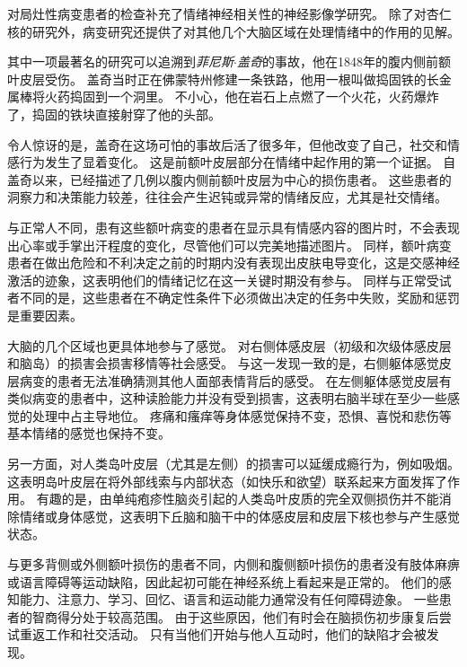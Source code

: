 \begin{proposition}[情绪损伤研究] \label{box:42_2}
	
	\quad \quad 对局灶性病变患者的检查补充了情绪神经相关性的神经影像学研究。
	除了对杏仁核的研究外，病变研究还提供了对其他几个大脑区域在处理情绪中的作用的见解。
	
	\quad \quad 其中一项最著名的研究可以追溯到\textit{菲尼斯$\cdot$盖奇}的事故，他在1848年的腹内侧前额叶皮层受伤。
	盖奇当时正在佛蒙特州修建一条铁路，他用一根叫做捣固铁的长金属棒将火药捣固到一个洞里。
	不小心，他在岩石上点燃了一个火花，火药爆炸了，捣固的铁块直接射穿了他的头部。
	
	\quad \quad 令人惊讶的是，盖奇在这场可怕的事故后活了很多年，但他改变了自己，社交和情感行为发生了显着变化。
	这是前额叶皮层部分在情绪中起作用的第一个证据。
	自盖奇以来，已经描述了几例以腹内侧前额叶皮层为中心的损伤患者。
	这些患者的洞察力和决策能力较差，往往会产生迟钝或异常的情绪反应，尤其是社交情绪。
	
	\quad \quad 与正常人不同，患有这些额叶病变的患者在显示具有情感内容的图片时，不会表现出心率或手掌出汗程度的变化，尽管他们可以完美地描述图片。
	同样，额叶病变患者在做出危险和不利决定之前的时期内没有表现出皮肤电导变化，这是交感神经激活的迹象，这表明他们的情绪记忆在这一关键时期没有参与。
	同样与正常受试者不同的是，这些患者在不确定性条件下必须做出决定的任务中失败，奖励和惩罚是重要因素。
	
	\quad \quad 大脑的几个区域也更具体地参与了感觉。
	对右侧体感皮层（初级和次级体感皮层和脑岛）的损害会损害移情等社会感受。
	与这一发现一致的是，右侧躯体感觉皮层病变的患者无法准确猜测其他人面部表情背后的感受。
	在左侧躯体感觉皮层有类似病变的患者中，这种读脸能力并没有受到损害，这表明右脑半球在至少一些感觉的处理中占主导地位。
	疼痛和瘙痒等身体感觉保持不变，恐惧、喜悦和悲伤等基本情绪的感觉也保持不变。
	
	\quad \quad 另一方面，对人类岛叶皮层（尤其是左侧）的损害可以延缓成瘾行为，例如吸烟。
	这表明岛叶皮层在将外部线索与内部状态（如快乐和欲望）联系起来方面发挥了作用。
	有趣的是，由单纯疱疹性脑炎引起的人类岛叶皮质的完全双侧损伤并不能消除情绪或身体感觉，这表明下丘脑和脑干中的体感皮层和皮层下核也参与产生感觉状态。
	
\end{proposition}


与更多背侧或外侧额叶损伤的患者不同，内侧和腹侧额叶损伤的患者没有肢体麻痹或语言障碍等运动缺陷，因此起初可能在神经系统上看起来是正常的。
他们的感知能力、注意力、学习、回忆、语言和运动能力通常没有任何障碍迹象。
一些患者的智商得分处于较高范围。
由于这些原因，他们有时会在脑损伤初步康复后尝试重返工作和社交活动。
只有当他们开始与他人互动时，他们的缺陷才会被发现。


